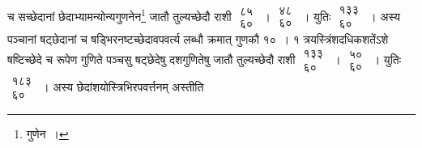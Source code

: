 \documentclass[10pt, openany]{book}
\begin{document}
{च सच्छेदानां छेदाभ्यामन्योन्यगुणनेन\renewcommand{\thefootnote}{\s ७}\footnote{\s *गुणेन~।} जातौ तुल्यच्छेदौ राशी $\begin{matrix}

\mbox{{८५}}\\

\mbox{{६०}}

\end{matrix}$~। $\begin{matrix}

\mbox{{४८}}\\

\mbox{{६०}}

\end{matrix}$~। युतिः $\begin{matrix}

\mbox{{१३३}}\\

\mbox{{६०}}

\end{matrix}$~। अस्य पञ्चानां षट्छेदानां च षड्भिरनष्टच्छेदावपवर्त्य लब्धौ
क्रमात् गुणकौ १०~। १ त्रयस्त्रिंशदधिकशतेंऽशे षष्टिच्छेदे च रूपेण गुणिते पञ्चसु
षट्छेदेषु दशगुणितेषु जातौ तुल्यच्छेदौ राशी $\begin{matrix}

\mbox{{१३३}}\\

\mbox{{६०}}

\end{matrix}$~। $\begin{matrix}

\mbox{{५०}}\\

\mbox{{६०}}

\end{matrix}$~। युतिः $\begin{matrix}

\mbox{{१८३}}\\

\mbox{{६०}}

\end{matrix}$~। अस्य छेदांशयोस्त्रिभिरपवर्त्तनम् अस्तीति}

\newpage
\end{document}
